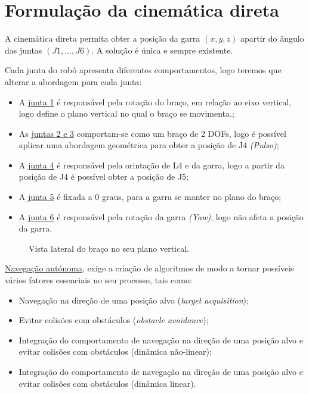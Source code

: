 \chapter{Formulação da cinemática direta}
\label{ch:dir_kin}
%
A cinemática direta permita obter a posição da garra $(x, y, z)$ apartir do ângulo das juntas $(J1, \dots, J6)$. A solução é única e sempre existente.

Cada junta do robô apresenta diferentes comportamentos, logo teremos que alterar a abordagem para cada junta:

\begin{itemize}
    \item A \underline{junta 1} é responsável pela rotação do braço, em relação ao eixo vertical, logo define o plano vertical no qual o braço se movimenta.;
    \item As \underline{juntas 2 e 3} comportam-se como um braço de 2 DOFs, logo é possível aplicar uma abordagem geométrica para obter a posição de J4 \textit{(Pulso)};
    \item A \underline{junta 4} é responsável pela orintação de L4 e da garra, logo a partir da posição de J4 é possível obter a posição de J5;
    \item A \underline{junta 5} é fixada a 0 graus, para a garra se manter no plano do braço;
    \item A \underline{junta 6} é responsável pela rotação da garra \textit{(Yaw)}, logo não afeta a posição da garra.
\end{itemize}

\begin{figure}[h]
  \centering
  
  \caption{Vista lateral do braço no seu plano vertical.}
  \label{fig:lateral}
\end{figure}

\underline{Navegação autónoma}, exige a criação de algoritmos de modo a tornar possíveis vários fatores essenciais no seu processo, tais como: 
\begin{itemize}
    \item Navegação na direção de uma posição alvo (\textit{target acquisition});
    \item Evitar colisões com obstáculos (\textit{obstacle avoidance}); 
    \item Integração do comportamento de navegação na direção de uma posição alvo e evitar colisões com obstáculos (dinâmica não-linear); 
    \item Integração do comportamento de navegação na direção de uma posição alvo e evitar colisões com obstáculos (dinâmica linear). 
\end{itemize}

